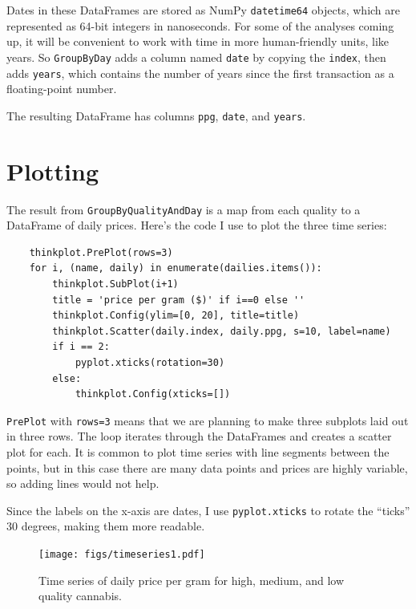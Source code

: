 \documentclass[12pt]{book}
\theoremstyle{exercise}
\begin{document}
Dates in these DataFrames are stored as NumPy {\tt datetime64}
objects, which are represented as 64-bit integers in nanoseconds.
For some of the analyses coming up, it will be convenient to
work with time in more human-friendly units, like years.  So
{\tt GroupByDay} adds a column named {\tt date} by copying
the {\tt index}, then adds {\tt years}, which contains the number
of years since the first transaction as a floating-point number.%
%

The resulting DataFrame has columns {\tt ppg}, {\tt date}, and
{\tt years}.%


\section{Plotting}

The result from {\tt GroupByQualityAndDay} is a map from each quality
to a DataFrame of daily prices.  Here's the code I use to plot
the three time series:%
%

\begin{verbatim}
    thinkplot.PrePlot(rows=3)
    for i, (name, daily) in enumerate(dailies.items()):
        thinkplot.SubPlot(i+1)
        title = 'price per gram ($)' if i==0 else ''
        thinkplot.Config(ylim=[0, 20], title=title)
        thinkplot.Scatter(daily.index, daily.ppg, s=10, label=name)
        if i == 2: 
            pyplot.xticks(rotation=30)
        else:
            thinkplot.Config(xticks=[])
\end{verbatim}

{\tt PrePlot} with {\tt rows=3} means that we are planning to
make three subplots laid out in three rows.  The loop iterates
through the DataFrames and creates a scatter plot for each.  It is
common to plot time series with line segments between the points,
but in this case there are many data points and prices are highly
variable, so adding lines would not help.%

Since the labels on the x-axis are dates, I use {\tt pyplot.xticks}
to rotate the ``ticks'' 30 degrees, making them more readable.%
%
%

\begin{figure}
\centerline{\texttt{[image: figs/timeseries1.pdf]}}
\caption{Time series of daily price per gram for high, medium, and low
quality cannabis.}%
\label{timeseries1}
\end{figure}
\end{document}
